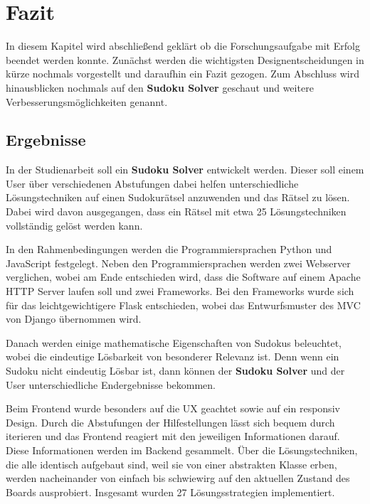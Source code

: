 
\chapter{Fazit}

In diesem Kapitel wird abschließend geklärt ob die Forschungsaufgabe mit Erfolg beendet werden konnte. Zunächst werden die wichtigsten Designentscheidungen in kürze nochmals vorgestellt und daraufhin ein Fazit gezogen. Zum Abschluss wird hinausblicken nochmals auf den \textbf{Sudoku Solver} geschaut und weitere Verbesserungsmöglichkeiten genannt. 

\section{Ergebnisse}

In der Studienarbeit soll ein \textbf{Sudoku Solver} entwickelt werden. Dieser soll einem User über verschiedenen Abstufungen dabei helfen unterschiedliche Lösungstechniken auf einen Sudokurätsel anzuwenden und das Rätsel zu lösen. Dabei wird davon ausgegangen, dass ein Rätsel mit etwa 25 Lösungstechniken vollständig gelöst werden kann. 

In den Rahmenbedingungen werden die Programmiersprachen Python und JavaScript festgelegt. Neben den Programmiersprachen werden zwei Webserver verglichen, wobei am Ende entschieden wird, dass die Software auf einem Apache \Ac{HTTP} Server laufen soll und zwei Frameworks. Bei den Frameworks wurde sich für das leichtgewichtigere Flask entschieden, wobei das Entwurfsmuster des \ac{MVC} von Django übernommen wird.

Danach werden einige mathematische Eigenschaften von Sudokus beleuchtet, wobei die eindeutige Lösbarkeit von besonderer Relevanz ist. Denn wenn ein Sudoku nicht eindeutig Lösbar ist, dann können der \textbf{Sudoku Solver} und der User unterschiedliche Endergebnisse bekommen.

Beim Frontend wurde besonders auf die \ac{UX} geachtet sowie auf ein responsiv Design. Durch die Abstufungen der Hilfestellungen lässt sich bequem durch iterieren und das Frontend reagiert mit den jeweiligen Informationen darauf. Diese Informationen werden im Backend gesammelt. Über die Lösungstechniken, die alle identisch aufgebaut sind, weil sie von einer abstrakten Klasse erben, werden nacheinander von einfach bis schwiewirg auf den aktuellen Zustand des Boards ausprobiert. Insgesamt wurden 27 Lösungsstrategien implementiert.

